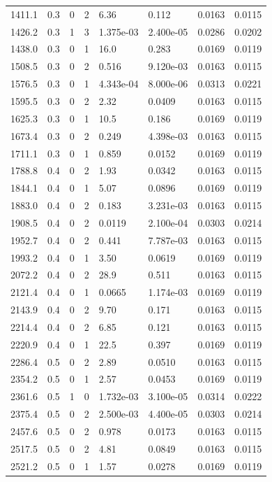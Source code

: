 \documentclass[preview]{standalone}
\begin{document}
{{{\begin{tabular}{L{1.2cm}C{1.2cm} C{0.3cm}C{0.5cm} C{1.4cm}C{1.4cm} C{1.4cm}C{1.4cm}}
  1411.1  &   0.3  & 0     &  2 &  6.36  & 0.112  & 0.0163 &  0.0115   \\ 
  1426.2  &   0.3  & 1     &  3 &  1.375e-03  & 2.400e-05  & 0.0286 &  0.0202   \\ 
  1438.0  &   0.3  & 0     &  1 &  16.0  & 0.283  & 0.0169 &  0.0119   \\ 
  1508.5  &   0.3  & 0     &  2 &  0.516  & 9.120e-03  & 0.0163 &  0.0115   \\ 
  1576.5  &   0.3  & 0     &  1 &  4.343e-04  & 8.000e-06  & 0.0313 &  0.0221   \\ 
  1595.5  &   0.3  & 0     &  2 &  2.32  & 0.0409  & 0.0163 &  0.0115   \\ 
  1625.3  &   0.3  & 0     &  1 &  10.5  & 0.186  & 0.0169 &  0.0119   \\ 
  1673.4  &   0.3  & 0     &  2 &  0.249  & 4.398e-03  & 0.0163 &  0.0115   \\ 
  1711.1  &   0.3  & 0     &  1 &  0.859  & 0.0152  & 0.0169 &  0.0119   \\ 
  1788.8  &   0.4  & 0     &  2 &  1.93  & 0.0342  & 0.0163 &  0.0115   \\ 
  1844.1  &   0.4  & 0     &  1 &  5.07  & 0.0896  & 0.0169 &  0.0119   \\ 
  1883.0  &   0.4  & 0     &  2 &  0.183  & 3.231e-03  & 0.0163 &  0.0115   \\ 
  1908.5  &   0.4  & 0     &  2 &  0.0119  & 2.100e-04  & 0.0303 &  0.0214   \\ 
  1952.7  &   0.4  & 0     &  2 &  0.441  & 7.787e-03  & 0.0163 &  0.0115   \\ 
  1993.2  &   0.4  & 0     &  1 &  3.50  & 0.0619  & 0.0169 &  0.0119   \\ 
  2072.2  &   0.4  & 0     &  2 &  28.9  & 0.511  & 0.0163 &  0.0115   \\ 
  2121.4  &   0.4  & 0     &  1 &  0.0665  & 1.174e-03  & 0.0169 &  0.0119   \\ 
  2143.9  &   0.4  & 0     &  2 &  9.70  & 0.171  & 0.0163 &  0.0115   \\ 
  2214.4  &   0.4  & 0     &  2 &  6.85  & 0.121  & 0.0163 &  0.0115   \\ 
  2220.9  &   0.4  & 0     &  1 &  22.5  & 0.397  & 0.0169 &  0.0119   \\ 
  2286.4  &   0.5  & 0     &  2 &  2.89  & 0.0510  & 0.0163 &  0.0115   \\ 
  2354.2  &   0.5  & 0     &  1 &  2.57  & 0.0453  & 0.0169 &  0.0119   \\ 
  2361.6  &   0.5  & 1     &  0 &  1.732e-03  & 3.100e-05  & 0.0314 &  0.0222   \\ 
  2375.4  &   0.5  & 0     &  2 &  2.500e-03  & 4.400e-05  & 0.0303 &  0.0214   \\ 
  2457.6  &   0.5  & 0     &  2 &  0.978  & 0.0173  & 0.0163 &  0.0115   \\ 
  2517.5  &   0.5  & 0     &  2 &  4.81  & 0.0849  & 0.0163 &  0.0115   \\ 
  2521.2  &   0.5  & 0     &  1 &  1.57  & 0.0278  & 0.0169 &  0.0119   \\ 
\hline 
\end{tabular} 

}}}
\end{document}
